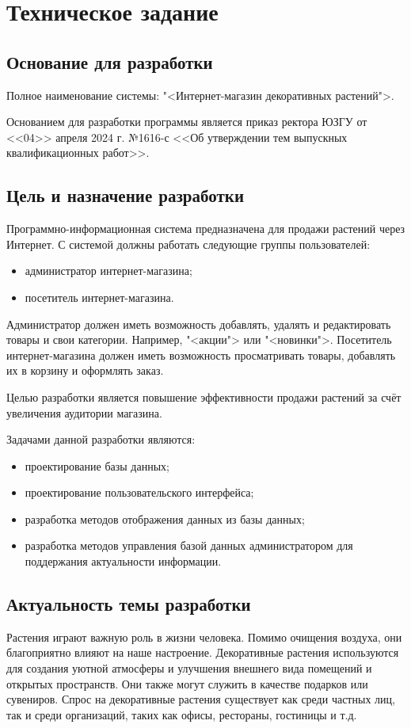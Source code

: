 \section{Техническое задание}
\subsection{Основание для разработки}

Полное наименование системы: "<Интернет-магазин декоративных растений">.

Основанием для разработки программы является приказ ректора ЮЗГУ от <<04>> апреля 2024 г. №1616-с <<Об утверждении тем выпускных квалификационных работ>>.


\subsection{Цель и назначение разработки}
Программно-информационная система предназначена для продажи растений через Интернет.
С системой должны работать следующие группы пользователей:
\begin{itemize}
	\item администратор интернет-магазина;
	\item посетитель интернет-магазина.
\end{itemize}

Администратор должен иметь возможность добавлять, удалять и редактировать товары и свои категории. Например, "<акции"> или "<новинки">.
Посетитель интернет-магазина должен иметь возможность просматривать товары, добавлять их в корзину и оформлять заказ.

Целью разработки является повышение эффективности продажи растений за счёт увеличения аудитории магазина.

Задачами данной разработки являются:
\begin{itemize}
	\item проектирование базы данных;
	\item проектирование пользовательского интерфейса;
	\item разработка методов отображения данных из базы данных;
	\item разработка методов управления базой данных администратором для поддержания актуальности информации.
\end{itemize}

\subsection{Актуальность темы разработки}
Растения играют важную роль в жизни человека. Помимо очищения воздуха, они благоприятно влияют на наше настроение. Декоративные растения используются для создания уютной атмосферы и улучшения внешнего вида помещений и открытых пространств. Они также могут служить в качестве подарков или сувениров. Спрос на декоративные растения существует как среди частных лиц, так и среди организаций, таких как офисы, рестораны, гостиницы и т.д. 

